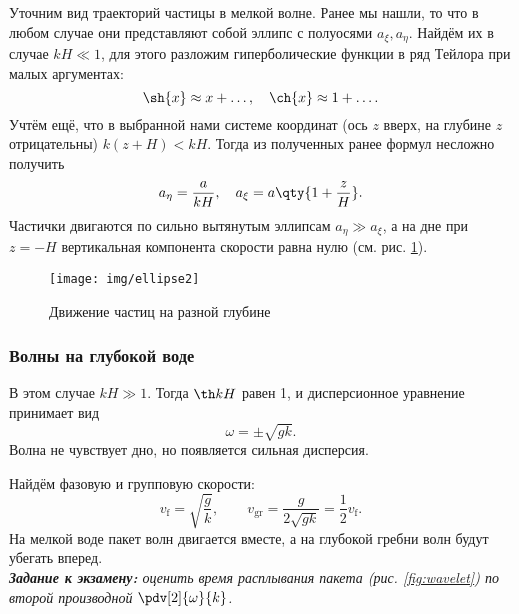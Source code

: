 Уточним вид траекторий частицы в мелкой волне. Ранее мы нашли, то что в любом случае они представляют собой эллипс с полуосями $a_\xi, a_\eta$. Найдём их в случае $kH\ll 1$, для этого разложим гиперболические функции  в ряд Тейлора при малых аргументах:
\begin{equation}
    \sh{x}\approx x+\ldots, \quad \ch{x}\approx 1+\ldots.
\end{equation}
Учтём ещё, что в выбранной нами системе координат (ось $z$ вверх, на глубине $z$ отрицательны) $k(z+H)<kH$. Тогда из полученных ранее формул несложно получить
\begin{equation}
    a_\eta = \frac{a}{kH}, \quad
    a_\xi = a\qty{1+\frac{z}{H}}.
\end{equation}
Частички двигаются по сильно вытянутым эллипсам $a_\eta \gg a_\xi$, а на дне при $z=-H$ вертикальная компонента скорости равна нулю (см. рис. \ref{fig:ellipse2}).

\begin{figure}[H]
    \centering
    \texttt{[image: img/ellipse2]}
    \caption{Движение частиц на разной глубине}
    \label{fig:ellipse2}
\end{figure}



\subsubsection{Волны на глубокой воде}

В этом случае $kH \gg 1$. Тогда $\th kH$ равен 1, и дисперсионное уравнение принимает вид
\begin{equation}
	\omega=\pm\sqrt{gk}.
\end{equation}
Волна не чувствует дно, но появляется сильная дисперсия.

Найдём фазовую и групповую скорости:
\begin{equation}
	v_\text{f}=\sqrt{\frac{g}{k}}, \qquad v_\text{gr}=\frac{g}{2\sqrt{gk}}=\frac12 v_\text{f}.
\end{equation}
На мелкой воде пакет волн двигается вместе, а на глубокой гребни волн будут убегать вперед.\\\vspace{8pt}
\textit{\textbf{Задание к экзамену:} оценить время расплывания пакета (рис. \ref{fig:wavelet}) по второй производной $\pdv[2]{\omega}{k}$.}
\vspace{8pt}

